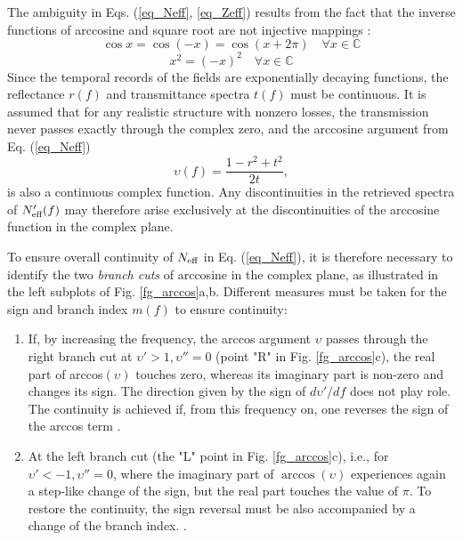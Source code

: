 The ambiguity in Eqs. (\ref{eq_Neff}, \ref{eq_Zeff}) results from the fact that the inverse functions of arccosine and square root are not injective mappings \cite{simovski2009material}:
\begin{equation} \cos x = \cos (-x) = \cos(x+2\pi) \quad  \forall x\in\mathbb{C} \label{eq_noninjN}\end{equation}
\begin{equation} x^2 = (-x)^2 \quad \forall x\in\mathbb{C} \label{eq_noninjZ}\end{equation}
Since the temporal records of the fields are exponentially decaying functions, the reflectance  $r(f)$ and transmittance spectra $t(f)$ must be continuous. 
It is assumed that for any realistic structure with nonzero losses, the transmission never passes exactly through the complex zero, and the arccosine argument from Eq. (\ref{eq_Neff})
\begin{equation} \upsilon(f) = \frac{1-r^2+t^2}{2t},   \label{eq_upsilon}\end{equation}
is also a continuous complex function. Any discontinuities in the retrieved spectra of $N_{\text{eff} }'(f)$ may therefore arise exclusively at the discontinuities of the arccosine function in the complex plane.

To ensure overall continuity of $N_{\text{eff} }$ in Eq. (\ref{eq_Neff}), it is therefore necessary to identify the two \textit{branch cuts} of arccosine in the complex plane, as illustrated in the left subplots of Fig. \ref{fg_arccos}a,b. Different measures must be taken for the sign and branch index $m(f)$ to ensure continuity:
\begin{enumerate}
\item{
If, by increasing the frequency, the arccos argument $\upsilon$ passes through the right branch cut at $\upsilon' > 1, \upsilon'' = 0$ (point "R" in Fig. \ref{fg_arccos}c), the real part of arccos$(\upsilon)$ touches zero, whereas its imaginary part is non-zero and changes its sign. The direction given by the sign of $d\upsilon'/df$ does not play role. The continuity is achieved if, from this frequency on, one reverses the sign of the arccos term . 
} 
\item{
		At the left branch cut (the "L" point in Fig. \ref{fg_arccos}c), i.e., for $\upsilon' < -1, \upsilon''=0$, where the imaginary part of $\arccos(\upsilon)$ experiences again a step-like change of the sign, but the real part touches the value of $\pi$. To restore the continuity, the sign reversal must be also accompanied by a change of the branch index. . 
} 
 \end{enumerate}

